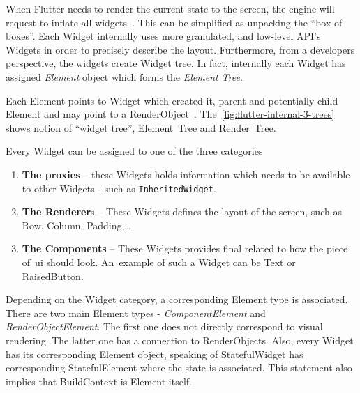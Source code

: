 When Flutter needs to render the current state to the screen, the engine will request to inflate all widgets~\cite{didier-internals}. This can be simplified as unpacking the ``box of boxes''. Each Widget internally uses more granulated, and low-level API's Widgets in order to precisely describe the layout. Furthermore, from a developers perspective, the widgets create Widget tree. In fact, internally each Widget has assigned \textit{Element} object which forms the \textit{Element Tree}.

Each Element points to Widget which created it, parent and potentially child Element and may point to a RenderObject~\cite{didier-internals}.  The~\cref{fig:flutter-internal-3-trees} shows notion of ``widget tree'', Element~Tree and Render~Tree.

Every Widget can be assigned to one of the three categories~\cite{didier-internals}
\begin{enumerate}
\item \textbf{The proxies}  -- these Widgets holds information which needs to be available to other Widgets - such as \verb|InheritedWidget|.
\item \textbf{The Renderer}s -- These Widgets defines the layout of the screen, such as Row, Column, Padding,\ldots
\item \textbf{The Components} -- These Widgets provides final related to how the piece of~\gls{ui} should look. An~example of such a Widget can be Text or RaisedButton. 
\end{enumerate}
Depending on the Widget category, a corresponding Element type is associated. There are two main Element types - \textit{ComponentElement} and \textit{RenderObjectElement}. The first one does not directly correspond to visual rendering. The latter one has a connection to RenderObjects.  Also, every Widget has its corresponding Element object, speaking of StatefulWidget has corresponding StatefulElement where the state is associated. This statement also implies that BuildContext is Element itself. 
